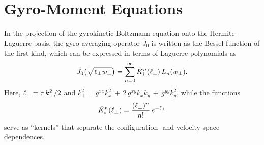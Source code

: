 \documentclass{article}
\begin{document}
\section{Gyro-Moment Equations}
In the projection of the gyrokinetic Boltzmann equation onto the Hermite-Laguerre basis, the gyro-averaging operator $\hat J_0$ is written as the Bessel function of the first kind, which can be expressed in terms of Laguerre polynomials as
\begin{equation}
    \hat J_0\bigl(\sqrt{\ell_\perp w_{\perp}}\bigr)  =  \sum_{n=0}^\infty \hat K_i^n(\ell_\perp)\,L_n(w_{\perp}).
\label{eq:bess_lag}
\end{equation}
Here, $\ell_\perp = \tau\,k_\perp^2/2$ and $k_\perp^2 = g^{xx}k_x^2 \,+\,2\, g^{xy}k_xk_y \,+\, g^{yy}k_y^2$, while the functions
\begin{equation}
    \hat K_i^n(\ell_\perp)  =  \frac{(\ell_\perp)^n}{n!} \, e^{-\ell_\perp}
    \label{eq:kernel}
\end{equation}
serve as ``kernels'' that separate the configuration- and velocity-space dependences.  
\end{document}
